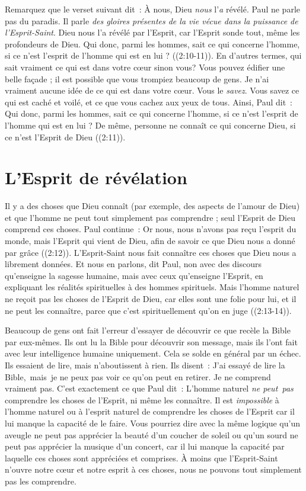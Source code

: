 Remarquez que le verset suivant dit~:
 \Og À nous, Dieu \emph{nous} l'\emph{a} révélé. \Fg{}
 Paul ne parle pas du paradis.
 Il parle \emph{des gloires présentes de la vie vécue dans la puissance
 de l'Esprit-Saint}.
 \Og Dieu nous l'a révélé par l'Esprit, car l'Esprit sonde tout,
 même les profondeurs de Dieu. Qui donc, parmi les hommes,
 sait ce qui concerne l'homme, si ce n'est l'esprit de l'homme
 qui est en lui ? \Fg{} ((2:10-11)).
 En d'autres termes, qui sait vraiment ce qui est dans votre cœur sinon vous?
 Vous pouvez édifier une belle façade ; il est possible que vous trompiez
 beaucoup de gens.
 Je n'ai vraiment aucune idée de ce qui est dans votre cœur.
 Vous le \emph{savez}.
 Vous savez ce qui est caché et voilé, et ce que vous cachez aux yeux de tous.
 Ainsi, Paul dit~:
 \Og Qui donc, parmi les hommes, sait ce qui concerne l'homme,
 si ce n'est l'esprit de l'homme qui est en lui ?
 De même, personne ne connaît ce qui concerne Dieu,
 si ce n'est l'Esprit de Dieu \Fg{} ((2:11)).


\section{L'Esprit de r\'ev\'elation}

Il y a des choses que Dieu connaît
 (par exemple, des aspects de l'amour de Dieu)
 et que l'homme ne peut tout simplement pas comprendre ;
 seul l'Esprit de Dieu comprend ces choses. Paul continue~:
 \Og Or nous, nous n'avons pas reçu l'esprit du monde,
 mais l'Esprit qui vient de Dieu, afin de savoir ce que Dieu
 nous a donné par grâce \Fg{} ((2:12)).
 L'Esprit-Saint nous fait connaître ces choses que Dieu
 nous a librement données.
 \Og Et nous en parlons, dit Paul, non avec des discours qu'enseigne
 la sagesse humaine, mais avec ceux qu'enseigne l'Esprit,
 en expliquant les réalités spirituelles à des hommes spirituels.
 Mais l'homme naturel ne reçoit pas les choses de l'Esprit de Dieu,
 car elles sont une folie pour lui, et il ne peut les connaître,
 parce que c'est spirituellement qu'on en juge \Fg{}
 ((2:13-14)).

Beaucoup de gens ont fait l'erreur d'essayer de découvrir ce que recèle
 la Bible par eux-mêmes. Ils ont lu la Bible pour découvrir son message,
 mais ils l'ont fait avec leur intelligence humaine uniquement.
 Cela se solde en général par un échec. Ils essaient de lire,
 mais n'aboutissent à rien. Ils disent~:
 \Og J'ai essayé de lire la Bible,~mais~je ne peux pas voir ce qu'on peut
 en retirer. Je ne comprend vraiment pas. \Fg{}
 C'est exactement ce que Paul dit~:
 \Og L'homme naturel \emph{ne peut~pas} comprendre les choses de l'Esprit,
 ni même les connaître. \Fg{}
 Il est \emph{impossible} à l'homme naturel ou à l'esprit naturel
 de comprendre les choses de l'Esprit car il lui manque la capacité
 de le faire. Vous pourriez dire avec la même logique qu'un aveugle
 ne peut pas apprécier la beauté d'un coucher de soleil ou qu'un sourd
 ne peut pas apprécier la musique d'un concert, car il lui manque la capacité
 par laquelle ces choses sont appréciées et comprises.
 À moins que l'Esprit-Saint n'ouvre notre cœur et notre esprit à ces choses,
 nous ne pouvons tout simplement pas les comprendre.


